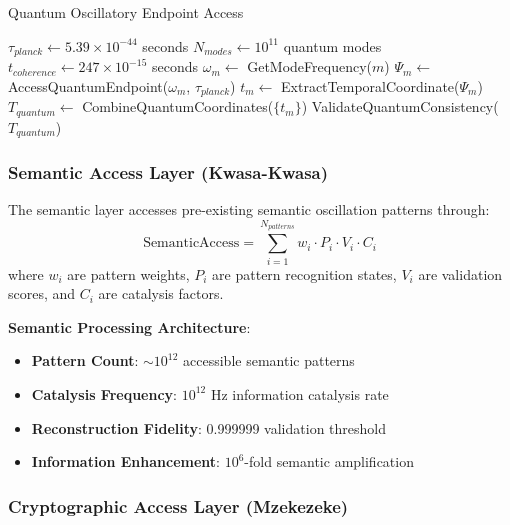 \documentclass[11pt,a4paper]{article}
\begin{document}
\begin{itemize}
\begin{itemize}
\begin{algorithm}
\caption{Quantum Oscillatory Endpoint Access}
\begin{algorithmic}
    \State $\tau_{planck} \leftarrow 5.39 \times 10^{-44}$ seconds
    \State $N_{modes} \leftarrow 10^{11}$ quantum modes
    \State $t_{coherence} \leftarrow 247 \times 10^{-15}$ seconds
        \State $\omega_m \leftarrow$ GetModeFrequency($m$)
        \State $\Psi_m \leftarrow$ AccessQuantumEndpoint($\omega_m$, $\tau_{planck}$)
        \State $t_m \leftarrow$ ExtractTemporalCoordinate($\Psi_m$)
    \EndFor
    \State $T_{quantum} \leftarrow$ CombineQuantumCoordinates($\{t_m\}$)
    \State \Return ValidateQuantumConsistency($T_{quantum}$)
\EndProcedure
\end{algorithmic}
\end{algorithm}

\subsubsection{Semantic Access Layer (Kwasa-Kwasa)}

\begin{definition}
The semantic layer accesses pre-existing semantic oscillation patterns through:
\begin{equation}
\text{SemanticAccess} = \sum_{i=1}^{N_{patterns}} w_i \cdot P_i \cdot V_i \cdot C_i
\end{equation}
where $w_i$ are pattern weights, $P_i$ are pattern recognition states, $V_i$ are validation scores, and $C_i$ are catalysis factors.
\end{definition}

\textbf{Semantic Processing Architecture}:
\begin{itemize}
\item \textbf{Pattern Count}: $\sim 10^{12}$ accessible semantic patterns
\item \textbf{Catalysis Frequency}: $10^{12}$ Hz information catalysis rate
\item \textbf{Reconstruction Fidelity}: 0.999999 validation threshold
\item \textbf{Information Enhancement}: $10^6$-fold semantic amplification
\end{itemize}

\subsubsection{Cryptographic Access Layer (Mzekezeke)}


\end{itemize}
\end{itemize}
\end{document}
